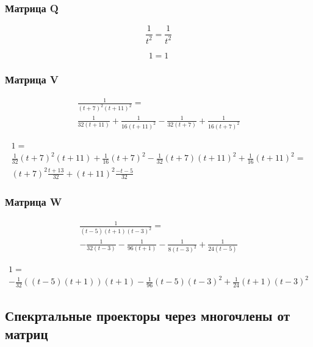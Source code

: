 \documentclass[12pt, a4paper]{article}
\begin{document}
    \subsubsection{Матрица Q}

    \begin{equation}
        \frac{1}{t^2} = \frac{1}{t^2}
    \end{equation}

    \begin{equation}
        1 = 1
    \end{equation}

    
    \subsubsection{Матрица V}

    \begin{multline}
        \frac{1}{(t + 7)^2(t + 11)^2} = \\
         \frac{1}{32 (t + 11)} + \frac{1}{16 (t + 11)^2} - \frac{1}{32 (t + 7)} + \frac{1}{16 (t + 7)^2}
    \end{multline}

    \begin{multline}
        1 = \\ \frac{1}{32} (t + 7)^2(t + 11) + \frac{1}{16} (t+7)^2 - \frac{1}{32} (t + 7)(t+11)^2 + \frac{1}{16} (t + 11)^2 = \\
        (t + 7)^2 \frac{t + 13}{32} + (t + 11)^2 \frac{-t-5}{32}
    \end{multline}

    
    \subsubsection{Матрица W}

    \begin{multline}
        \frac{1}{(t - 5)(t + 1)(t - 3)^2} = \\
        -\frac{1}{32 (t - 3)} - \frac{1}{96 (t + 1)} - \frac{1}{8 (t - 3)^2} + \frac{1}{24 (t - 5)}
    \end{multline}

    \begin{multline}
        1 = \\ -\frac{1}{32} \left((t - 5)(t + 1)\right) (t + 1) - \frac{1}{96}(t - 5)(t - 3)^2 + \frac{1}{24} (t + 1) (t - 3)^2
    \end{multline}


    
    \subsection{Спекртальные проекторы через многочлены от матриц}
\end{document}
